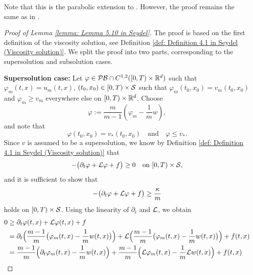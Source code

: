 \begin{remark}
    Note that this is the parabolic extension to {\cite[Lemma 5.10]{seydel2010generalexistenceuniquenessviscosity}}. However, the proof remains the same as in \cite{seydel2010generalexistenceuniquenessviscosity}. 
\end{remark}
\begin{proof}[Proof of Lemma \ref{lemma: Lemma 5.10 in Seydel}]
    The proof is based on the first definition of the viscosity solution, see Definition \ref{def: Definition 4.1 in Seydel (Viscosity solution)}. We split the proof into two parts, corresponding to the supersolution and subsolution cases.

    \textbf{Supersolution case:} Let $\varphi \in \mathcal{PB} \cap C^{1,2}([0,T) \times \mathbb{R}^d)$ such that $\varphi_m(t,x) = u_m(t,x)$, $(t_0,x_0) \in [0,T) \times \mathcal{S}$ such that $\varphi_m(t_0,x_0) = v_m(t_0,x_0)$ and $\varphi_m \geq v_m$ everywhere else on $[0,T) \times \mathbb{R}^d$.  Choose 
    \begin{equation*}
        \varphi := \frac{m}{m-1} \left( \varphi_m -  \frac 1 m w \right),
    \end{equation*}
    and note that 
    \begin{equation*}
        \varphi(t_0,x_0) = v_*(t_0,x_0) \quad \text{and} \quad \varphi \leq v_*.
    \end{equation*}
    Since $v$ is assumed to be a supersolution, we know by Definition \ref{def: Definition 4.1 in Seydel (Viscosity solution)} that
    \begin{equation*}
        - \big( \partial_t \varphi + \mathcal{L} \varphi + f\big) \geq 0 \quad \text{on } [0,T) \times \mathcal{S},
    \end{equation*}
    and it is sufficient to show that
    \begin{equation*}
        -\big(\partial_t \varphi + \mathcal{L} \varphi + f \big) \geq \frac{\kappa}{m}
    \end{equation*}
    holds on $[0,T) \times \mathcal{S}$. Using the linearity of $\partial_t$ and $\mathcal{L}$, we obtain
    \begin{align*}
        0 &\geq \partial_t \varphi(t,x) + \InfinitesimalGenerator \varphi(t,x) + f \\
        &= \partial_t \Big( \frac{m-1}{m} \big( \varphi_m(t,x) - \frac 1 m w(t,x) \big) \Big) + \InfinitesimalGenerator \Big( \frac{m-1}{m} \big( \varphi_m(t,x) - \frac 1 m w(t,x) \big) \Big) + f(t,x) \\
        &= \frac{m-1}{m} \Big( \partial_t \varphi_m(t,x) - \frac 1 m w (t,x) \Big) + \frac{m-1}{m} \Big( \InfinitesimalGenerator \varphi_m(t,x) - \frac{1}{m} \InfinitesimalGenerator w(t,x) \Big) + f(t,x) \\

\end{align*}
\end{proof}
